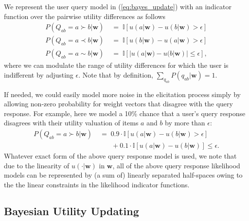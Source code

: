 \documentclass[letterpaper]{article}
\newcommand{\I}{\mathbb{I}}
\renewcommand{\vec}[1]{\mathbf{#1}}
\begin{document}
We represent the user query model in
(\ref{eq:bayes_update}) with an indicator function over the pairwise utility
differences as follows 
\begin{align}
P(Q_{ab}=a \succ b|\vec{w}) & \; = \; \I[u(a|\vec{w}) - u(b|\vec{w}) > \epsilon] \nonumber \\
P(Q_{ab}=a \prec b|\vec{w}) & \; = \; \I[u(b|\vec{w}) - u(a|\vec{w}) > \epsilon] \nonumber \\
P(Q_{ab}=a \sim  b|\vec{w}) & \; = \; \I[|u(a|\vec{w}) - u(b|\vec{w})| \leq \epsilon], 
\label{eq:p_qij_hat}
\end{align}
where we can modulate the range of utility differences for which the
user is indifferent by adjusting $\epsilon$.  Note that by definition,
$\sum_{q_{ab}} P(q_{ab}|\vec{w}) = 1$.

If needed, we could easily model more noise in the elicitation process
simply by allowing non-zero probability for weight vectors that
disagree with the query response.  For example, here we model a 10\%
chance that a user's query response disagrees with their utility valuation
of items $a$ and $b$ by more than $\epsilon$:
\begin{align}
P(Q_{ab}=a \succ b|\vec{w}) & \; = \; 0.9 \cdot \I[u(a|\vec{w}) - u(b|\vec{w}) > \epsilon]  
\nonumber \\ & \qquad + 0.1 \cdot \I[u(a|\vec{w}) - u(b|\vec{w})] \leq \epsilon \label{eq:p_qij_mod} .
\end{align} 
Whatever exact form of the above query response model is used, we note
that due to the linearity of $u(\cdot|\vec{w})$ in $\vec{w}$, all of
the above query response likelihood models can be represented by (a
sum of) linearly separated half-spaces owing to the the linear
constraints in the likelihood indicator functions.

\subsection{Bayesian Utility Updating}

\label{sec:pe_model_infer}
\end{document}
